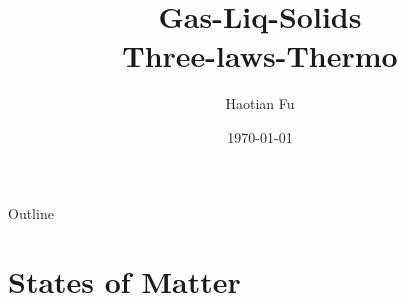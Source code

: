\documentclass[12pt,compress]{beamer}
\title{Gas-Liq-Solids \\ Three-laws-Thermo}
\author{Haotian Fu}
\institute{University of Michigan--Shanghai Jiao Tong University Joint Institute}
\date{\today}
\begin{document}


\frame{\titlepage}

\section[Outline]{}
\begin{frame}{Outline}
	\tableofcontents
\end{frame}


\section{States of Matter}
\end{document}
